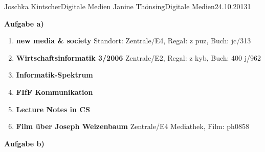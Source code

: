 \documentclass{wa}
\begin{document}
	{Joschka Kintscher}{Digitale Medien}
	{Janine Thönsing}{Digitale Medien}{24.10.2013}{1}


\begin{LARGE}
  \textbf{Aufgabe a)}
\end{LARGE}

\begin{enumerate}
  \item\textbf{new media \& society}
  \newline
  Standort: Zentrale/E4, Regal: z puz, Buch: jc/313
  \newline
  \cite{vergeer2013}

  \item\textbf{Wirtschaftsinformatik 3/2006}
  \newline
  Zentrale/E2, Regal: z kyb, Buch: 400 j/962
  \newline
  \cite{thiesse2006}

  \item\textbf{Informatik-Spektrum}
  \newline
  \cite{lintu2009}

  \item\textbf{FIfF Kommunikation}
  \newline
  \cite{bockerman2013}

  \item\textbf{Lecture Notes in CS}
  \newline
  \cite{temdee2006}
 
  \item\textbf{Film über Joseph Weizenbaum}
  \newline
  Zentrale/E4 Mediathek, Film: ph0858
  \newline
  \cite{haas2006}
  \newline
\end{enumerate}

\begin{LARGE}
  \textbf{Aufgabe b)}
\end{LARGE}



\end{document}
